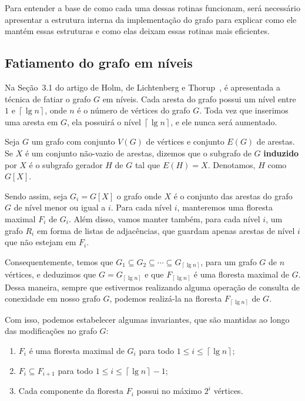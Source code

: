 Para entender a base de como cada uma dessas rotinas funcionam, será necessário apresentar a estrutura interna da implementação do grafo para explicar como ele mantém essas estruturas e como elas deixam essas rotinas mais eficientes.

\subsection{Fatiamento do grafo em níveis}
\label{sec:level-slicing}

Na Seção~3.1 do artigo de Holm, de Lichtenberg e Thorup~\cite{jacob_holm}, é apresentada a técnica de fatiar o grafo $G$ em níveis. Cada aresta do grafo possui um nível entre $1$ e $\left\lceil \lg n \right\rceil$, onde $n$ é o número de vértices do grafo $G$. Toda vez que inserimos uma aresta em $G$, ela possuirá o nível $\left\lceil \lg n \right\rceil$, e ele nunca será aumentado. 

Seja $G$ um grafo com conjunto $V(G)$ de vértices e conjunto $E(G)$ de arestas. Se $X$ é um conjunto não-vazio de arestas, dizemos que o subgrafo de $G$ \textbf{induzido} por $X$ é o subgrafo gerador $H$ de $G$ tal que $E(H) = X$. Denotamos, $H$ como $G[X]$.

Sendo assim, seja $G_i = G[X]$ o grafo onde $X$ é o conjunto das arestas do grafo $G$ de nível menor ou igual a $i$. Para cada nível $i$, manteremos uma floresta maximal $F_i$ de $G_i$. Além disso, vamos manter também, para cada nível $i$, um grafo $R_i$ em forma de listas de adjacências, que guardam apenas arestas de nível $i$ que não estejam em $F_i$. 

Consequentemente, temos que $G_1 \subseteq G_2 \subseteq \cdots \subseteq G_{\left\lceil \lg n \right\rceil}$, para um grafo $G$ de $n$ vértices, e deduzimos que $G = G_{\left\lceil \lg n \right\rceil}$ e que $F_{\left\lceil \lg n \right\rceil}$ é uma floresta maximal de $G$. Dessa maneira, sempre que estivermos realizando alguma operação de consulta de conexidade em nosso grafo $G$, podemos realizá-la na floresta $F_{\left\lceil \lg n \right\rceil}$ de $G$.

Com isso, podemos estabelecer algumas invariantes, que são mantidas ao longo das modificações no grafo $G$:

\begin{enumerate}[label=(\Roman*)]
    \item \label{invariant1} $F_i$ é uma floresta maximal de $G_i$ para todo $1 \leq i \leq  \left\lceil \lg n \right\rceil$;
    
    \item \label{invariant2} $F_i \subseteq F_{i+1}$ para todo $1 \leq i \leq \left\lceil \lg n \right\rceil - 1$;
    
    \item \label{invariant3} Cada componente da floresta $F_i$ possui no máximo $2^i$ vértices.
\end{enumerate}

